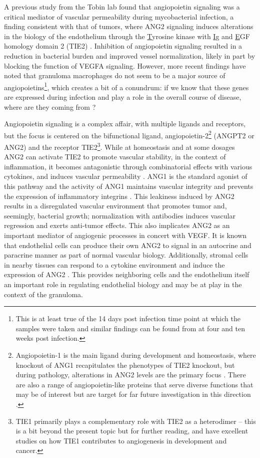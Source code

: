 A previous study from the Tobin lab found that angiopoietin signaling was a critical mediator of vascular permeability during mycobacterial infection, a finding consistent with that of tumors, where ANG2 signaling induces alterations in the biology of the endothelium through the \underline{T}yrosine kinase with \underline{I}g and \underline{E}GF homology domain 2 (TIE2) \citep{Oehlers2017, Duran2021, Goel2012, Thurston2012}. Inhibition of angiopoietin signaling resulted in a reduction in bacterial burden and improved vessel normalization, likely in part by blocking the function of VEGFA signaling. However, more recent findings have noted that granuloma macrophages do not seem to be a major source of angiopoietins\footnote{This is at least true of the 14 days post infection time point at which the samples were taken and similar findings can be found from \citet{Gideon2022} at four and ten weeks post infection.}, which creates a bit of a conundrum: if we know that these genes are expressed during infection and play a role in the overall course of disease, where are they coming from \citep{Cronan2021}?

Angiopoietin signaling is a complex affair, with multiple ligands and receptors, but the focus is centered on the bifunctional ligand, angiopoietin\hyp{}2\footnote{Angiopoietin\hyp{}1 is the main ligand during development and homeostasis, where knockout of ANG1 recapitulates the phenotypes of TIE2 knockout, but during pathology, alterations in ANG2 levels are the primary focus \citep{Akwii2021}. There are also a range of angiopoietin\hyp{}like proteins that serve diverse functions that may be of interest but are target for far future investigation in this direction \citep{Hato2008}.} (ANGPT2 or ANG2) and the receptor TIE2\footnote{TIE1 primarily plays a complementary role with TIE2 as a heterodimer -- this is a bit beyond the present topic but for further reading, \citet{Savant2015} and \citet{LaPorta2018} have excellent studies on how TIE1 contributes to angiogenesis in development and cancer.}. While at homeostasis and at some dosages ANG2 can activate TIE2 to promote vascular stability, in the context of inflammation, it becomes antagonistic through combinatorial effects with various cytokines, and induces vascular permeability \citep{Augustin2009}. ANG1 is the standard agonist of this pathway and the activity of ANG1 maintains vascular integrity and prevents the expression of inflammatory integrins \citep{Augustin2009}. This leakiness induced by ANG2 results in a disregulated vascular environment that promotes tumor and, seemingly, bacterial growth; normalization with antibodies induces vascular regression and exerts anti\hyp{}tumor effects. This also implicates ANG2 as an important mediator of angiogenic processes in concert with VEGF. It is known that endothelial cells can produce their own ANG2 to signal in an autocrine and paracrine manner as part of normal vascular biology. Additionally, stromal cells in nearby tissues can respond to a cytokine environment and induce the expression of ANG2 \citep{Huang2010, Hato2008, Thurston2012}. This provides neighboring cells and the endothelium itself an important role in regulating endothelial biology and may be at play in the context of the granuloma.


